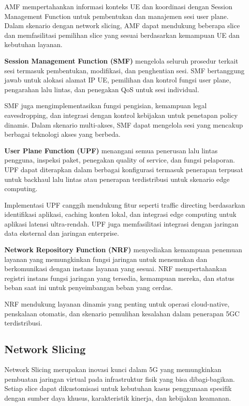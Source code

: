 AMF mempertahankan informasi konteks UE dan koordinasi dengan Session Management Function untuk pembentukan dan manajemen sesi user plane. Dalam skenario dengan network slicing, AMF dapat mendukung beberapa slice dan memfasilitasi pemilihan slice yang sesuai berdasarkan kemampuan UE dan kebutuhan layanan.

\textbf{Session Management Function (SMF)} mengelola seluruh prosedur terkait sesi termasuk pembentukan, modifikasi, dan penghentian sesi. SMF bertanggung jawab untuk alokasi alamat IP UE, pemilihan dan kontrol fungsi user plane, pengarahan lalu lintas, dan penegakan QoS untuk sesi individual.

SMF juga mengimplementasikan fungsi pengisian, kemampuan legal eavesdropping, dan integrasi dengan kontrol kebijakan untuk penetapan policy dinamis. Dalam skenario multi-akses, SMF dapat mengelola sesi yang mencakup berbagai teknologi akses yang berbeda.

\textbf{User Plane Function (UPF)} menangani semua penerusan lalu lintas pengguna, inspeksi paket, penegakan quality of service, dan fungsi pelaporan. UPF dapat diterapkan dalam berbagai konfigurasi termasuk penerapan terpusat untuk backhaul lalu lintas atau penerapan terdistribusi untuk skenario edge computing.

Implementasi UPF canggih mendukung fitur seperti traffic directing berdasarkan identifikasi aplikasi, caching konten lokal, dan integrasi edge computing untuk aplikasi latensi ultra-rendah. UPF juga memfasilitasi integrasi dengan jaringan data eksternal dan jaringan enterprise.

\textbf{Network Repository Function (NRF)} menyediakan kemampuan penemuan layanan yang memungkinkan fungsi jaringan untuk menemukan dan berkomunikasi dengan instans layanan yang sesuai. NRF mempertahankan registri instans fungsi jaringan yang tersedia, kemampuan mereka, dan status beban saat ini untuk penyeimbangan beban yang cerdas.

NRF mendukung layanan dinamis yang penting untuk operasi cloud-native, penskalaan otomatis, dan skenario pemulihan kesalahan dalam penerapan 5GC terdistribusi.

\subsection{Network Slicing}

Network Slicing merupakan inovasi kunci dalam 5G yang memungkinkan pembuatan jaringan virtual pada infrastruktur fisik yang bisa dibagi-bagikan. Setiap slice dapat dikustomisasi untuk kebutuhan kasus penggunaan spesifik dengan sumber daya khusus, karakteristik kinerja, dan kebijakan keamanan.

